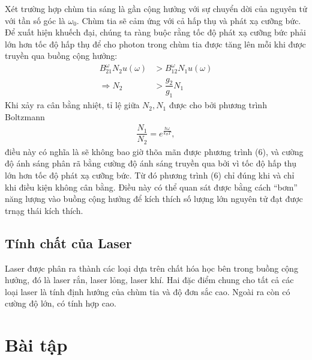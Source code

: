 \documentclass{article}
\newcommand{\f}[2]{\dfrac{#1}{#2}}
\begin{document}
Xét trường hợp chùm tia sáng là gần cộng hưởng với sự chuyển dời của nguyên tử với tần số góc là $\omega_0$. Chùm tia sẽ cảm ứng với cả hấp thụ và phát xạ cưỡng bức. Để xuất hiện khuếch đại, chúng ta ràng buộc rằng tốc độ phát xạ cưỡng bức phải lớn hơn tốc độ hấp thụ để cho photon trong chùm tia được tăng lên mỗi khi được truyền qua buồng cộng hưởng:
\begin{align}
	B_{21}^{\omega} N_2 u(\omega) & > B_{12}^{\omega} N_1 u(\omega) \\
	\Rightarrow N_2               & > \f{g_2}{g_1}N_1
\end{align}
Khi xảy ra cân bằng nhiệt, tỉ lệ giữa $N_2,N_1$ được cho bởi phương trình Boltzmann
\begin{align*}
	\f{N_1}{N_2} = e^{\frac{\hbar \omega}{k_B T}},
\end{align*}
điều này có nghĩa là sẽ không bao giờ thõa mãn được phương trình (6), và cường độ ánh sáng phân rã bằng cường độ ánh sáng truyền qua bởi vì tốc độ hấp thụ	lớn hơn tốc độ phát xạ cưỡng bức. Từ đó phương trình (6) chỉ đúng khi và chỉ khi điều kiện không cân bằng. Điều này có thể quan sát được bằng cách ``bơm'' năng lượng vào buồng cộng hưởng để kích thích số lượng lớn nguyên tử đạt được trnạg thái kích thích.

\subsection{Tính chất của Laser}
Laser được phân ra thành các loại dựa trên chất hóa học bên trong buồng cộng hưởng, đó là laser rắn, laser lỏng, laser khí. Hai đặc điểm chung cho tất cả các loại laser là tính định hướng của chùm tia và độ đơn sắc cao. Ngoài ra còn có cường độ lớn, có tính hợp cao.

\section{Bài tập}
\end{document}

